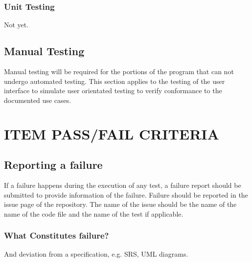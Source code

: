 {{\subsubsection{Unit Testing}
Not yet.

\subsection{Manual Testing}
Manual testing will be required for the portions of the program that can not undergo  automated testing. This section applies to the testing of the user interface to simulate user orientated testing to verify conformance to the documented use cases.
}

\section[ITEM PASS/FAIL CRITERIA]{\bfseries\color{black}
	 ITEM PASS/FAIL CRITERIA}
{\color{black}
\subsection{Reporting a failure}
If a failure happens during the execution of any test, a failure report should be submitted to provide information of the failure. Failure should be reported in the issue page of the repository.
\newline
The name of the issue should be the name of the name of the code file and the name of the test if applicable.

\subsubsection{What Constitutes failure?}
And deviation from a specification, e.g. SRS, UML diagrams.

}}
